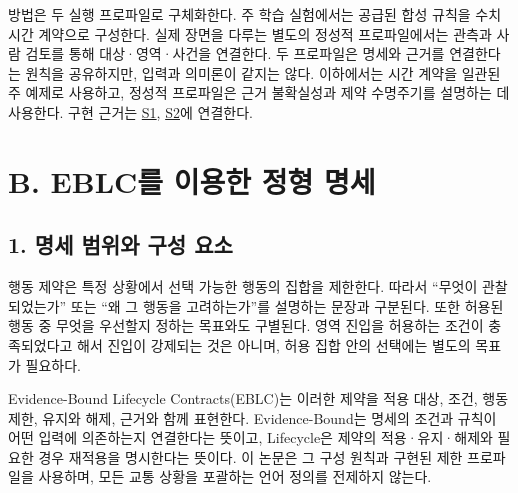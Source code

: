 \documentclass[11pt,a4paper]{article}
\begin{document}
방법은 두 실행 프로파일로 구체화한다. 주 학습 실험에서는 공급된 합성 규칙을 수치 시간 계약으로 구성한다. 실제 장면을 다루는 별도의 정성적 프로파일에서는 관측과 사람 검토를 통해 대상·영역·사건을 연결한다. 두 프로파일은 명세와 근거를 연결한다는 원칙을 공유하지만, 입력과 의미론이 같지는 않다. 이하에서는 시간 계약을 일관된 주 예제로 사용하고, 정성적 프로파일은 근거 불확실성과 제약 수명주기를 설명하는 데 사용한다. 구현 근거는 \href{\detokenize{../../../../../../projects/04-guardsynth-coc/experiments/paper1_cnl_learning/temporal_preservation.py}}{S1}, \href{\detokenize{../../../../../../platforms/eblc-bcv/src/guard_synth_eblc/action_contract.py}}{S2}에 연결한다.\par

\section*{B. EBLC를 이용한 정형 명세}

\subsection*{1. 명세 범위와 구성 요소}

행동 제약은 특정 상황에서 선택 가능한 행동의 집합을 제한한다. 따라서 “무엇이 관찰되었는가” 또는 “왜 그 행동을 고려하는가”를 설명하는 문장과 구분된다. 또한 허용된 행동 중 무엇을 우선할지 정하는 목표와도 구별된다. 영역 진입을 허용하는 조건이 충족되었다고 해서 진입이 강제되는 것은 아니며, 허용 집합 안의 선택에는 별도의 목표가 필요하다.\par

Evidence-Bound Lifecycle Contracts(EBLC)는 이러한 제약을 적용 대상, 조건, 행동 제한, 유지와 해제, 근거와 함께 표현한다. Evidence-Bound는 명세의 조건과 규칙이 어떤 입력에 의존하는지 연결한다는 뜻이고, Lifecycle은 제약의 적용·유지·해제와 필요한 경우 재적용을 명시한다는 뜻이다. 이 논문은 그 구성 원칙과 구현된 제한 프로파일을 사용하며, 모든 교통 상황을 포괄하는 언어 정의를 전제하지 않는다.\par
\end{document}

